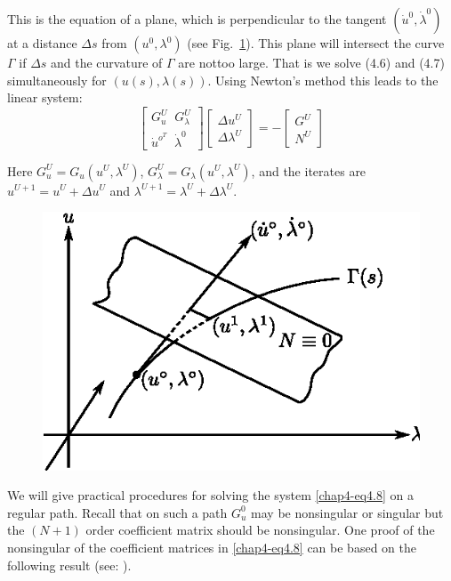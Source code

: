  This is the equation of a plane, which is perpendicular to the
 tangent $(\dot{u}^0, \dot{\lambda}^0)$ at a distance $\Delta s$ from
 $(u^0, \lambda^0)$ (see Fig.~\ref{chap4-fig4.1}). 
This plane will intersect the
curve $\Gamma$ if $\Delta s$  and the curvature of $\Gamma$ are
not\pageoriginale too large. That is we solve (4.6) and (4.7)
simultaneously for $(u(s), \lambda (s))$. Using Newton's method this
leads to the linear system: 
\begin{equation*}
\begin{bmatrix}
G^U_u \;\; G^U_\lambda \\ 
\dot{u}^{o^T} \;\; \dot{\lambda}^0
\end{bmatrix}
\begin{bmatrix}
\Delta u^U\\ \Delta \lambda ^U
\end{bmatrix}
=  - 
\begin{bmatrix}
G^U\\ N^U
\end{bmatrix} \tag{4.8}\label{chap4-eq4.8}
\end{equation*}
 
Here $G^U_u = G_u (u^U, \lambda^U)$, $G^U_\lambda = G_\lambda (u^U,
\lambda^U)$, and the iterates are $u^{U+1} = u^U + \Delta u^U$ and
$\lambda^{U+1} = \lambda^U + \Delta \lambda^U$. 
\begin{figure}[H]
\centering
\includegraphics{vol79-fig/fig79-24.eps}
\smallskip
\caption{}
\label{chap4-fig4.1}
\end{figure}

We will give practical procedures for solving the system
\eqref{chap4-eq4.8} on a 
regular path. Recall that on such a path $G^0_u$ may be nonsingular
or singular but the $(N+1)$ order coefficient matrix should be
nonsingular. One proof of the nonsingular of the coefficient matrices
in \eqref{chap4-eq4.8} can be based on the following result (see:
\cite{key7}).  
 
